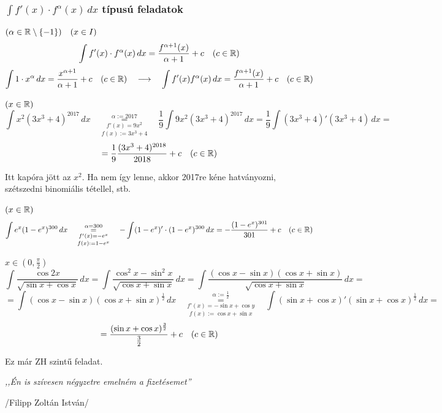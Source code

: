 \documentclass[a4paper,11.5pt]{article}
\begin{document}
	\subsubsection{$\int f'(x)\cdot f^\alpha(x)\,dx$ típusú feladatok}
	\begin{task} $(\alpha\in\mathbb{R}\setminus\{-1\})\quad (x\in I)$
		\[ \int f'(x)\cdot f^\alpha(x)\,dx=\frac{f^{\alpha+1}(x)}{\alpha+1}+c\quad (c\in\mathbb{R}) \]
		\[ \int 1\cdot x^\alpha\,dx=\frac{x^{\alpha+1}}{\alpha+1}+c\quad (c\in\mathbb{R})\quad \longrightarrow\quad \int f'(x)f^\alpha(x)\,dx=\frac{f^{\alpha+1}(x)}{\alpha+1}+c \quad (c\in\mathbb{R}) \]
	\end{task}
	\begin{task}
		$(x\in\mathbb{R})$
		\[ \int x^2(3x^3+4)^{2017}\,dx\quad \overset{\alpha:=2017}{\underset{f(x):=3x^3+4}{\underset{f'(x)=9x^2}{=}}}\quad \frac{1}{9}\int 9x^2(3x^3+4)^{2017}\,dx=\frac{1}{9}\int(3x^3+4)'(3x^3+4)\,dx=\]
		\[=\frac{1}{9}\frac{(3x^3+4)^{2018}}{2018}+c\quad (c\in\mathbb{R}) \]
		\begin{note}
			Itt kapóra jött az  $x^2$. Ha nem így lenne, akkor 2017re kéne hatványozni, szétszedni binomiális tétellel, stb.
		\end{note}
	\end{task}
	\begin{task}$(x\in\mathbb{R})$
		\[\int e^x (1-e^x)^{300}\,dx\quad \overset{\alpha=300}{\underset{f(x):=1-e^x}{\underset{f'(x)=-e^x}{=}}}\quad -\int(1-e^x)'\cdot(1-e^x)^{300}\,dx=-\frac{(1-e^x)^{301}}{301}+c\quad (c\in\mathbb{R}) \]
	\end{task}
	\begin{task}
		$x\in\left(0,\frac{\pi}{2}\right)$
		\[ \int\frac{\cos2x}{\sqrt{\sin x+\cos x}}\,dx = \int \frac{\cos^2 x-\sin^2 x}{\sqrt{\cos x+\sin x}}\,dx=\int\frac{(\cos x-\sin x)(\cos x+\sin x)}{\sqrt{\cos x+\sin x}}\,dx=\]
		\[=\int(\cos x-\sin x)(\cos x+\sin x)^{\frac{1}{2}}\,dx\quad \overset{\alpha:=\frac{1}{2}}{\underset{f(x):=\cos x+\sin x}{\underset{f'(x)=-\sin x+\cos y}{=}}}\quad \int(\sin x+\cos x)'(\sin x+\cos x)^{\frac{1}{2}}\,dx=\]
		\[=\frac{(\sin x + \cos x)^{\frac{3}{2}}}{\frac{3}{2}}+c\quad (c\in\mathbb{R}) \]
		\begin{note}
			Ez már ZH szintű feladat.
		\end{note}
		\begin{center}
			\textit{,,Én is szívesen négyzetre emelném a fizetésemet''}
			\smallskip
			
			/Filipp Zoltán István/
		\end{center}
	\end{task}
\end{document}
